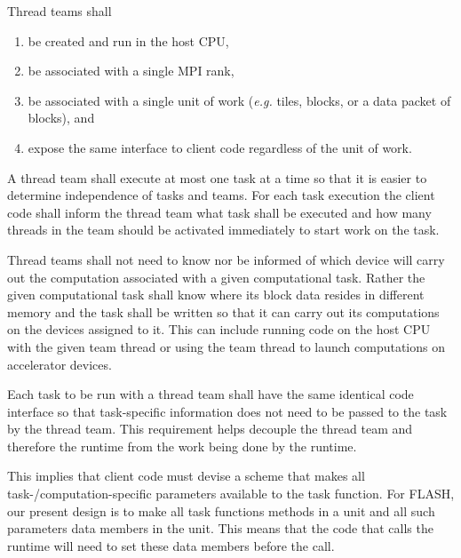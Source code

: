 \documentclass{article}
\begin{document}
\begin{req}
Thread teams shall
\begin{enumerate}
\item{be created and run in the host CPU,}
\item{be associated with a single MPI rank,}
\item{be associated with a single unit of work (\textit{e.g.} tiles, blocks, or a
data packet of blocks), and}
\item{expose the same interface to client code regardless of the unit of work.}
\end{enumerate}
\end{req}

\begin{req}
A thread team shall execute at most one task at a time so that it is easier to
determine independence of tasks and teams.  For each task execution the client
code shall inform the thread team what task shall be executed and how many
threads in the team should be activated immediately to start work on the task.
\end{req}

\begin{req}
Thread teams shall not need to know nor be informed of which device will carry
out the computation associated with a given computational task.  Rather the
given computational task shall know where its block data resides in different
memory and the task shall be written so that it can carry out its computations
on the devices assigned to it.  This can include running code on the host CPU
with the given team thread or using the team thread to launch computations on
accelerator devices.
\end{req}

\begin{req}
Each task to be run with a thread team shall have the same identical code
interface so that task-specific information does not need to be passed to the
task by the thread team.  This requirement helps decouple the thread team and
therefore the runtime from the work being done by the runtime.
\end{req}

This implies that client code must devise a scheme that makes all
task-/computation-specific parameters available to the task function.  For
FLASH, our present design is to make all task functions methods in a unit and
all such parameters data members in the unit.  This means that the code that
calls the runtime will need to set these data members before the call.
\end{document}
